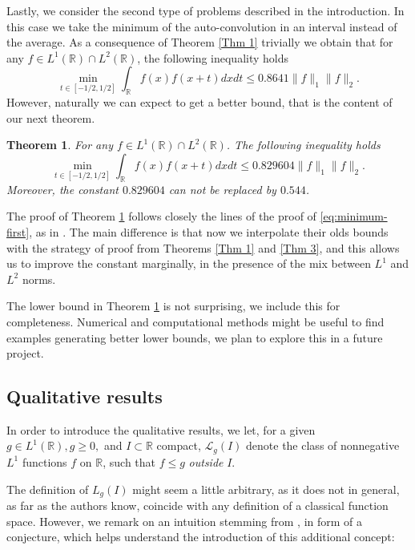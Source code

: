 \documentclass[11pt, reqno]{amsart}
\numberwithin{equation}{section}
\newtheorem{theorem}{Theorem}[section]
\newcommand{\R}{{\mathbb R}}
\begin{document}
Lastly, we consider the second type of problems described in the introduction. In this case we take the minimum of the auto-convolution in an interval instead of the average.
As a consequence of Theorem \ref{Thm 1} trivially we obtain that for any $f\in L^{1}(\R)\cap L^{2}(\R)$, the following inequality holds
\begin{equation}\label{Main eq 1}
\min_{t\in[{-1/2,1/2}]}\int_{\R}f(x)f(x+t)dxdt\leq 0.8641\|f\|_1\|f\|_2.
\end{equation}
However, naturally we can expect to get a better bound, that is the content of our next theorem.
\begin{theorem}\label{thm min 1}
For any $f\in L^{1}(\R)\cap L^{2}(\R)$. The following inequality holds
\begin{equation}\label{Min eq 1}
\min_{t\in[{-1/2,1/2}]}\int_{\R}f(x)f(x+t)dxdt\leq 0.829604\|f\|_1\|f\|_2.
\end{equation}
Moreover, the constant $0.829604$ can not be replaced by $0.544$.
\end{theorem}

The proof of Theorem \ref{thm min 1} follows closely the lines of the proof of \eqref{eq:minimum-first}, as in \cite{BarnardSteinerberger}. The main difference is that now we interpolate their olds bounds with the strategy of proof from Theorems \ref{Thm 1} and \ref{Thm 3}, 
and this allows us to improve the constant marginally, in the presence of the mix between $L^1$ and $L^2$ norms.  

The lower bound in Theorem \ref{thm min 1} is not surprising, we include this for completeness. Numerical and computational methods might be useful to find examples generating better lower bounds, we plan to explore this in a future project.


\subsection{Qualitative results}

In order to introduce the qualitative results, we let, for a given $g \in L^1(\R), g \ge 0,$ and $I \subset \R$ compact, $\mathcal{L}_g(I)$ denote the class of nonnegative $L^1$ functions $f$ on $\R$, such that $f \le g$ \emph{outside}  $I.$

The definition of $L_g(I)$ might seem a little arbitrary, as it does not in general, as far as the authors know, coincide with any definition of a classical function space. However, we remark on an intuition stemming from \cite{BarnardSteinerberger}, in form of a conjecture, which helps understand the introduction of this additional concept:
\end{document}
